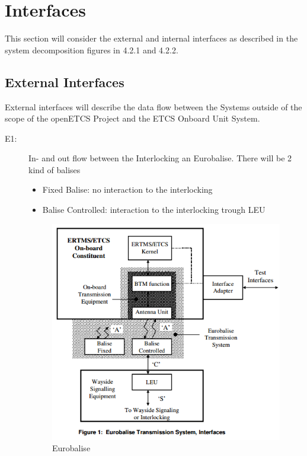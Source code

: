 \section{Interfaces}
This section will consider the external and internal interfaces as described in the system decomposition figures in 4.2.1 and 4.2.2.

\subsection{External Interfaces}
External interfaces will describe the data flow between the Systems outside of the scope of the openETCS Project and the ETCS Onboard Unit System.

\begin{description}
\item[E1:] In- and out flow between the Interlocking an Eurobalise. There will be 2 kind of balises
\begin{itemize}
\item Fixed Balise: no interaction to the interlocking
\item Balise Controlled: interaction to the interlocking trough LEU
\end{itemize}
\begin{figure}
\centering
\includegraphics[scale=0.8]{images/Eurobalise}
\caption{Eurobalise}
\label{Eurobalise}
\end{figure}


\end{description}
